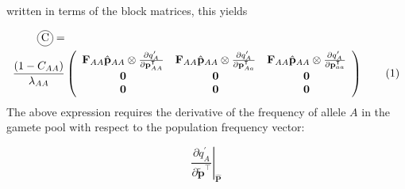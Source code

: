 \documentclass[11pt]{article}
\newcommand\encircle[1]{%
  \tikz[baseline=(X.base)] 
    \node (X) [draw, shape=circle, inner sep=0] {\strut #1};}
\newcommand\numberthis{\addtocounter{equation}{1}\tag{\theequation}}
\def\mbf#1{\mathbf{#1}}
\begin{document}
\noindent written in terms of the block matrices, this yields

{
\scriptsize
\begin{align*}
	\encircle{C} =& \\
	\frac{(1 - C_{AA})}{\lambda_{AA}} &\left(
			\begin{array}{ccc}
			\mbf{F}_{AA}\hat{\mbf{p}}_{AA} \otimes \frac{\partial q^{\prime}_{A}}{\partial \mbf{p}^{ \intercal}_{AA}}  &  \mbf{F}_{AA}\hat{\mbf{p}}_{AA} \otimes \frac{\partial q^{\prime}_{A}}{\partial \mbf{p}^{ \intercal}_{Aa}}  &  \mbf{F}_{AA}\hat{\mbf{p}}_{AA} \otimes \frac{\partial q^{\prime}_{A}}{\partial \mbf{p}^{ \intercal}_{aa}}\\
				\mbf{0} & \mbf{0} & \mbf{0}  \\
				\mbf{0} & \mbf{0} & \mbf{0} 
			\end{array} \right)  \numberthis			
\end{align*}
}
The above expression requires the derivative of the frequency of allele $A$ in the gamete pool with respect to the population frequency vector:

\begin{equation}
	\left. \frac{\partial q^{\prime}_{A}}{\partial \tilde{\mbf{p}}^{\intercal}} \right|_{\hat{\mbf{P}}}
\end{equation}
\end{document}
